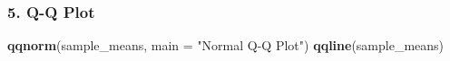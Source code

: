 \documentclass[]{article}
\newenvironment{Shaded}{\begin{snugshade}}{\end{snugshade}}
\newcommand{\KeywordTok}[1]{\textcolor[rgb]{0.13,0.29,0.53}{\textbf{#1}}}
\newcommand{\DataTypeTok}[1]{\textcolor[rgb]{0.13,0.29,0.53}{#1}}
\newcommand{\StringTok}[1]{\textcolor[rgb]{0.31,0.60,0.02}{#1}}
\newcommand{\NormalTok}[1]{#1}
\begin{document}
\subsubsection{5. Q-Q Plot}\label{q-q-plot}

\begin{Shaded}
\begin{Highlighting}[]
\KeywordTok{qqnorm}\NormalTok{(sample_means, }\DataTypeTok{main =} \StringTok{"Normal Q-Q Plot"}\NormalTok{)}
\KeywordTok{qqline}\NormalTok{(sample_means)}
\end{Highlighting}
\end{Shaded}
\end{document}
